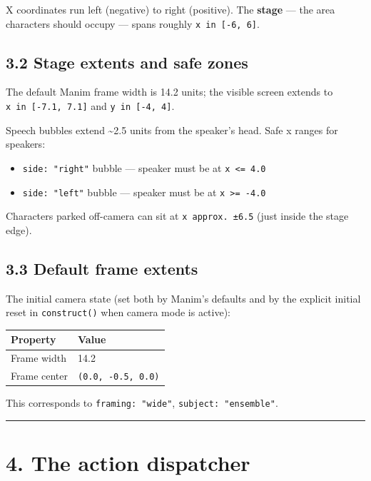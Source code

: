 \documentclass[
  12pt,
  letterpaper,
]{book}
\providecommand{\tightlist}{%
  \setlength{\itemsep}{0pt}\setlength{\parskip}{0pt}}
\begin{document}
X coordinates run left (negative) to right (positive). The
\textbf{stage} --- the area characters should occupy --- spans roughly
\texttt{x\ in\ {[}-6,\ 6{]}}.

\subsection{3.2 Stage extents and safe
zones}\label{stage-extents-and-safe-zones}

The default Manim frame width is 14.2 units; the visible screen extends
to \texttt{x\ in\ {[}-7.1,\ 7.1{]}} and \texttt{y\ in\ {[}-4,\ 4{]}}.

Speech bubbles extend \textasciitilde2.5 units from the speaker's head.
Safe x ranges for speakers:

\begin{itemize}
\tightlist
\item
  \texttt{side:\ "right"} bubble --- speaker must be at
  \texttt{x\ \textless{}=\ 4.0}
\item
  \texttt{side:\ "left"} bubble --- speaker must be at
  \texttt{x\ \textgreater{}=\ -4.0}
\end{itemize}

Characters parked off-camera can sit at \texttt{x\ approx.\ ±6.5} (just
inside the stage edge).

\subsection{3.3 Default frame extents}\label{default-frame-extents}

The initial camera state (set both by Manim's defaults and by the
explicit initial reset in \texttt{construct()} when camera mode is
active):

\begin{longtable}[]{@{}ll@{}}
\toprule\noalign{}
Property & Value \\
\midrule\noalign{}
\endhead
\bottomrule\noalign{}
\endlastfoot
Frame width & 14.2 \\
Frame center & \texttt{(0.0,\ -0.5,\ 0.0)} \\
\end{longtable}

This corresponds to \texttt{framing:\ "wide"},
\texttt{subject:\ "ensemble"}.

\begin{center}\rule{0.5\linewidth}{0.5pt}\end{center}

\section{4. The action dispatcher}\label{the-action-dispatcher}
\end{document}
